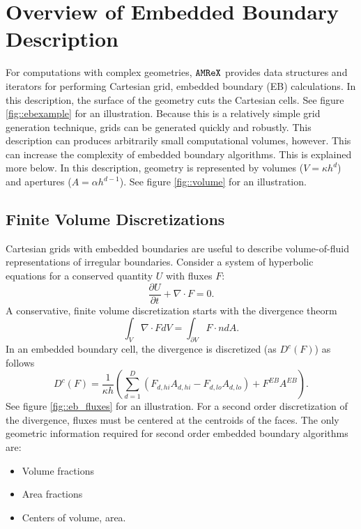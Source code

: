 \newcommand{\xbold}{{\bf x}}
\newcommand{\ibold}{{\bf i}}
\newcommand{\jbold}{{\bf j}}
\newcommand{\kbold}{{\bf k}}
\newcommand{\ebis}{{\tt EBIndexSpace}}
\newcommand{\baseif}{{\tt BaseIF}}
\newcommand{\sphereif}{{\tt SphereIF}}
\newcommand{\transformif}{{\tt TransformIF}}
\newcommand{\latheif}{{\tt LatheIF}}
\newcommand{\unionif}{{\tt UnionIF}}
\newcommand{\intersectionif}{{\tt IntersectionIF}}
\newcommand{\geom}{{\tt GeometryShop}}
\newcommand{\parm}{{\tt ParmParse}}

\section{Overview of Embedded Boundary Description}
\label{sec:EB:EBOverview}

For computations with complex geometries, $\tt{AMReX}$ provides data
structures and iterators for performing Cartesian grid, embedded
boundary (EB) calculations.    In this description, the surface of the
geometry cuts the Cartesian cells.   See figure \ref{fig::ebexample}
for an illustration.    Because this is a relatively simple grid
generation technique, grids can be generated quickly and robustly.
This description can produces arbitrarily small computational volumes,
however.    This can increase the complexity of embedded boundary
algorithms.   This is explained more below.
In this description,
geometry is represented by volumes ($V = \kappa h^d$) and apertures 
($A= \alpha h^{d-1}$).   See figure \ref{fig::volume}
for an illustration.     

\subsection{Finite Volume Discretizations}
Cartesian grids with embedded boundaries are 
useful to describe volume-of-fluid representations of irregular
boundaries.   
Consider a system of hyperbolic equations for a conserved quantity $U$
with fluxes $F$:
\begin{equation}
\frac{\partial U}{\partial t} + \nabla \cdot F = 0.
\label{eqn::hypsys}
\end{equation}
A conservative, finite volume discretization starts with
the divergence theorm
$$
\int_V \nabla \cdot F dV = \int_{\partial V} F \cdot n dA.
$$
In an embedded boundary cell, the divergence is discretized  (as
$D^c(F)$) as follows
\begin{equation}
D^c(F) = \frac{1}{\kappa h} \left( \sum^D_{d = 1}
  (F_{d, hi}A_{d,hi} - F_{d, lo}A_{d,lo})  + F^{EB} A^{EB} \right).
\label{eqn::ebdiv}
\end{equation}
See figure \ref{fig::eb_fluxes} for an illustration.  For a second
order discretization of the divergence, fluxes must be centered at the
centroids of the faces.  
The only geometric information required for second order embedded
boundary algorithms are:
\begin{itemize}
\item
Volume fractions
\item
Area fractions
\item 
Centers of volume, area.
\end{itemize}

